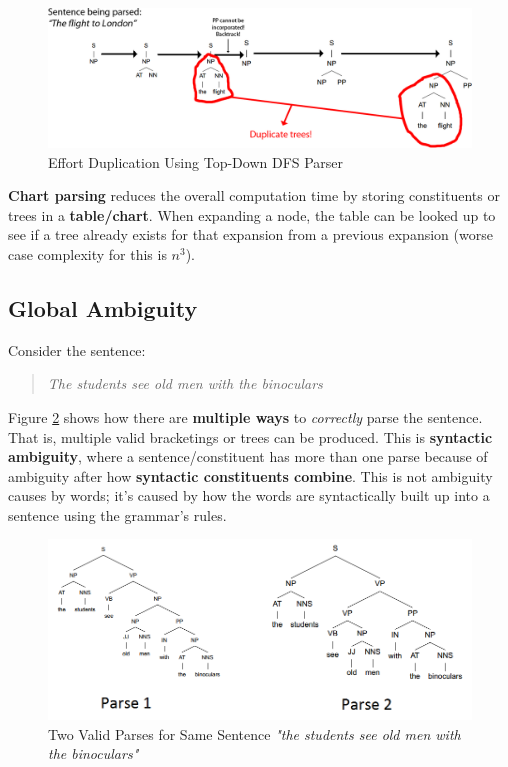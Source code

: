 \documentclass{article}
\begin{document}
\begin{figure}
	\centering
	\includegraphics[scale=0.3]{figures/parsing-effort-duplication.png}
	\caption{Effort Duplication Using Top-Down DFS Parser}
	\label{fig:effort-duplication}
\end{figure}

\textbf{Chart parsing} reduces the overall computation time by storing constituents or trees in a \textbf{table/chart}. When expanding a node, the table can be looked up to see if a tree already exists for that expansion from a previous expansion (worse case complexity for this is $n^3$).

\subsection{Global Ambiguity}

Consider the sentence:
\begin{quote}
	\textit{The students see old men with the binoculars}
\end{quote}
Figure \ref{fig:global-ambiguity} shows how there are \textbf{multiple ways} to \textit{correctly} parse the sentence. That is, multiple valid bracketings or trees can be produced. This is \textbf{syntactic ambiguity}, where a sentence/constituent has more than one parse because of ambiguity after how \textbf{syntactic constituents combine}. This is not ambiguity causes by words; it's caused by how the words are syntactically built up into a sentence using the grammar's rules.

\begin{figure}
	\centering
	\includegraphics[scale=0.6]{figures/multiple-parses-example.png}
	\caption{Two Valid Parses for Same Sentence \textit{"the students see old men with the binoculars"}}
	\label{fig:global-ambiguity}
\end{figure}
\end{document}
